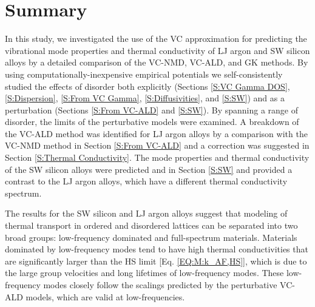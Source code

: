 \documentclass[12pt,twocolumn,iop]{/usr/share/texmf-texlive/tex/latex/iop/iopart}[/usr/share/texmf-texlive/tex/latex/iop/]
\begin{document}
\section{\label{S:Summary}Summary}

In this study, we investigated the use of the VC 
approximation for predicting the vibrational mode properties and 
thermal conductivity of LJ argon and SW silicon alloys 
by a detailed comparison of the VC-NMD, VC-ALD, and GK methods. 
By using computationally-inexpensive  
empirical potentials we self-consistently studied the effects of 
disorder both explicitly (Sections \ref{S:VC Gamma DOS}, 
\ref{S:Dispersion},  
\ref{S:From VC Gamma}, \ref{S:Diffusivities}, and \ref{S:SW}) 
and as a perturbation (Sections \ref{S:From VC-ALD} and \ref{S:SW}). 
By spanning a range of disorder, the limits of the 
perturbative models were examined.
A breakdown of the VC-ALD method was identified for LJ argon alloys 
by a comparison with the VC-NMD method in 
Section \ref{S:From VC-ALD}   
and a correction was suggested in Section \ref{S:Thermal Conductivity}. 
The mode properties and thermal 
conductivity of the SW silicon alloys were predicted and in 
Section \ref{S:SW} and provided a contrast to the 
LJ argon alloys, which have a different thermal conductivity 
spectrum. 

The results for the SW silicon and LJ argon alloys suggest that 
modeling of thermal transport in ordered and 
disordered lattices can be separated into two broad groups: 
low-frequency dominated and full-spectrum materials.  
Materials dominated by low-frequency modes tend to have high 
thermal conductivities that are significantly larger than the 
HS limit [Eq. \eqref{EQ:M:k_AF,HS}], 
which is due to the large group velocities and long lifetimes 
of low-frequency modes.\cite{abeles_thermal_1962,
abeles_lattice_1963,kamitakahara_vibrations_1974,
cahill_thermal_2004,cahill_thermal_2005,garg_role_2011,
lindsay_thermal_2012,cheaito_experimental_2012} 
These low-frequency modes  
closely follow the scalings predicted by the perturbative VC-ALD 
models, which are valid at low-frequencies. 
\end{document}
